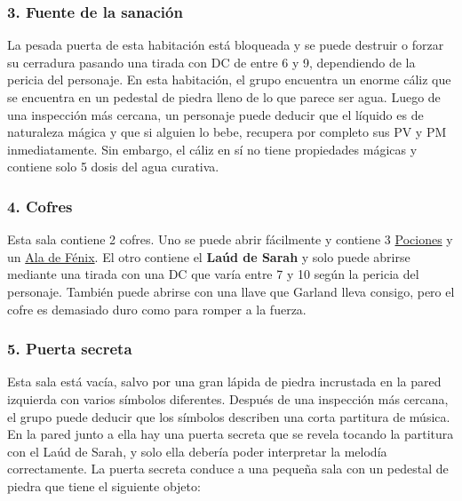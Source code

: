 \subsubsection*{3. Fuente de la sanación}
La pesada puerta de esta habitación está bloqueada y se puede destruir o forzar su cerradura pasando una tirada con DC de entre 6 y 9, dependiendo de la pericia del personaje. En esta habitación, el grupo encuentra un enorme cáliz que se encuentra en un pedestal de piedra lleno de lo que parece ser agua. Luego de una inspección más cercana, un personaje puede deducir que el líquido es de naturaleza mágica y que si alguien lo bebe, recupera por completo sus PV y PM inmediatamente. Sin embargo, el cáliz en sí no tiene propiedades mágicas y contiene solo 5 dosis del agua curativa. \subsubsection*{4. Cofres}
Esta sala contiene 2 cofres. Uno se puede abrir fácilmente y contiene 3 \hyperlink{item}{Pociones} y un \hyperlink{item}{Ala de Fénix}. El otro contiene el \textbf{Laúd de Sarah }y solo puede abrirse mediante una tirada con una DC que varía entre 7 y 10 según la pericia del personaje. También puede abrirse con una llave que Garland lleva consigo, pero el cofre es demasiado duro como para romper a la fuerza. \subsubsection*{5. Puerta secreta}
Esta sala está vacía, salvo por una gran lápida de piedra incrustada en la pared izquierda con varios símbolos diferentes. Después de una inspección más cercana, el grupo puede deducir que los símbolos describen una corta partitura de música. En la pared junto a ella hay una puerta secreta que se revela tocando la partitura con el Laúd de Sarah, y solo ella debería poder interpretar la melodía correctamente. La puerta secreta conduce a una pequeña sala con un pedestal de piedra que tiene el siguiente objeto: 
\vspace{0.3cm}
